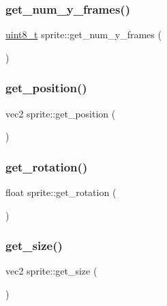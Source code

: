 \subsubsection{\texorpdfstring{get\+\_\+num\+\_\+y\+\_\+frames()}{get\_num\_y\_frames()}}
{\footnotesize\ttfamily \hyperlink{stdint_8h_aba7bc1797add20fe3efdf37ced1182c5}{uint8\+\_\+t} sprite\+::get\+\_\+num\+\_\+y\+\_\+frames (\begin{DoxyParamCaption}{ }\end{DoxyParamCaption})\hspace{0.3cm}{\ttfamily [inline]}}

\mbox{\label{classsprite_acd9a248ff0bb693c614b084d5200d651}} 
\subsubsection{\texorpdfstring{get\+\_\+position()}{get\_position()}}
{\footnotesize\ttfamily vec2 sprite\+::get\+\_\+position (\begin{DoxyParamCaption}{ }\end{DoxyParamCaption})\hspace{0.3cm}{\ttfamily [inline]}}

\mbox{\label{classsprite_a7b6bbbb227a4558c7d4a0e8fc4344bca}} 
\subsubsection{\texorpdfstring{get\+\_\+rotation()}{get\_rotation()}}
{\footnotesize\ttfamily float sprite\+::get\+\_\+rotation (\begin{DoxyParamCaption}{ }\end{DoxyParamCaption})\hspace{0.3cm}{\ttfamily [inline]}}

\mbox{\label{classsprite_acccf755d4af9f43b89554f7df47e0a4f}} 
\subsubsection{\texorpdfstring{get\+\_\+size()}{get\_size()}}
{\footnotesize\ttfamily vec2 sprite\+::get\+\_\+size (\begin{DoxyParamCaption}{ }\end{DoxyParamCaption})\hspace{0.3cm}{\ttfamily [inline]}}

